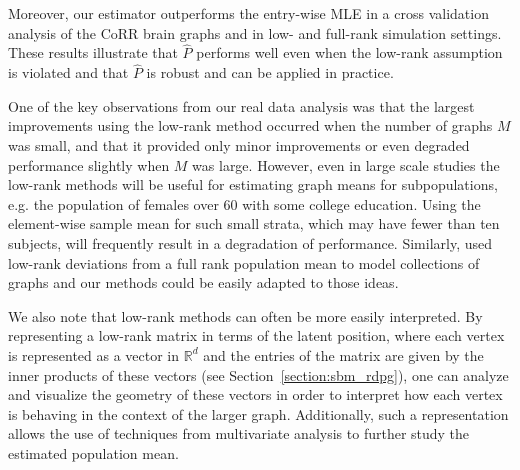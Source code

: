 \documentclass[10pt,letterpaper]{article}
\renewcommand{\Re}{\mathbb{R}}
\renewcommand{\hat}{\widehat}
\begin{document}
Moreover, our estimator outperforms the entry-wise MLE in a cross validation analysis of the CoRR brain graphs and in low- and full-rank simulation settings.
These results illustrate that $\hat{P}$ performs well even when the low-rank assumption is violated and that $\hat{P}$ is robust and can be applied in practice.

One of the key observations from our real data analysis was that the largest improvements using the low-rank method occurred when the number of graphs $M$ was small, and that it provided only minor improvements or even degraded performance slightly when $M$ was large. 
However, even in large scale studies the low-rank methods will be useful for estimating graph means for subpopulations, e.g. the population of females over 60 with some college education.
Using the element-wise sample mean for such small strata, which may have fewer than ten subjects, will frequently result in a degradation of performance.
Similarly, \citet{durante2014nonparametric} used low-rank deviations from a full rank population mean to model collections of graphs and our methods could be easily adapted to those ideas.

We also note that low-rank methods can often be more easily interpreted.
By representing a low-rank matrix in terms of the latent position, where each vertex is represented as a vector in $\Re^d$ and the entries of the matrix are given by the inner products of these vectors (see Section~\ref{section:sbm_rdpg}), one can analyze and visualize the geometry of these vectors in order to interpret how each vertex is behaving in the context of the larger graph. 
Additionally, such a representation allows the use of techniques from multivariate analysis to further study the estimated population mean.




\end{document}
